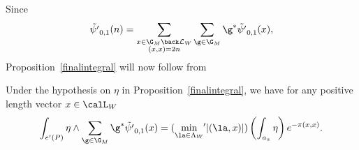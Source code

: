 Since 
\begin{equation*}
\tilde{\psi'}_{0,1}(n) = \sum_{ \substack{x\in \G_M \back \mathcal{L}_W \\ (x,x)=2n}} \sum_{ \g \in \G_M} \g^{\ast} \tilde{\psi'}_{0,1}(x),
\end{equation*}
Proposition~\ref{finalintegral} will now follow from

\begin{proposition}
Under the hypothesis on $\eta$ in Proposition~\ref{finalintegral}, we have for any positive length vector $x \in \calL_W$
\begin{equation*}
\int_{e'(P)} \eta \wedge \sum_{ \g \in \G_M} \g^{\ast} \tilde{\psi'}_{0,1}(x) = (\min_{\la \in \Lambda_W}  {\hspace{-2pt}'}|(\la,x)|) \left(\int_{a_x} \eta \right) e^{-\pi (x,x)}.
\end{equation*}
\end{proposition}


